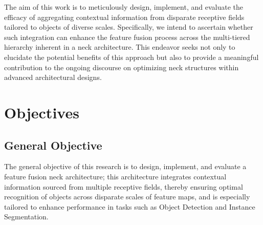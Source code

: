 The aim of this work is to meticulously design, implement, and evaluate the efficacy of aggregating contextual information from disparate receptive fields tailored to objects of diverse scales. Specifically, we intend to ascertain whether such integration can enhance the feature fusion process across the multi-tiered hierarchy inherent in a neck architecture. This endeavor seeks not only to elucidate the potential benefits of this approach but also to provide a meaningful contribution to the ongoing discourse on optimizing neck structures within advanced architectural designs.

\section{Objectives}
\subsection{General Objective}
The general objective of this research is to design, implement, and evaluate a feature fusion neck architecture; this architecture integrates contextual information sourced from multiple receptive fields, thereby ensuring optimal recognition of objects across disparate scales of feature maps, and is especially tailored to enhance performance in tasks such as Object Detection and Instance Segmentation.

